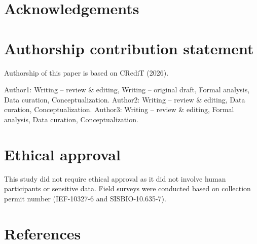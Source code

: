 \documentclass[
  american,
  letterpaper,
  DIV=11,
  numbers=noendperiod]{scrartcl}
\begin{document}
\section*{Acknowledgements}\label{acknowledgements}

\section*{Authorship contribution
statement}\label{authorship-contribution-statement}

Authorship of this paper is based on CRediT (2026).

Author1: Writing -- review \& editing, Writing -- original draft, Formal
analysis, Data curation, Conceptualization. Author2: Writing -- review
\& editing, Data curation, Conceptualization. Author3: Writing -- review
\& editing, Formal analysis, Data curation, Conceptualization.

\section*{Ethical approval}\label{ethical-approval}

This study did not require ethical approval as it did not involve human
participants or sensitive data. Field surveys were conducted based on
collection permit number (IEF-10327-6 and SISBIO-10.635-7).

\section*{References}\label{references}
\end{document}
